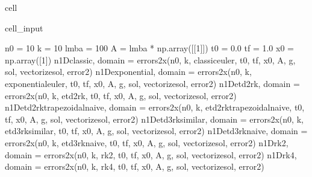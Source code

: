 \documentclass[letterpaper,10pt,english]{jupyterBook}
\begin{document}
\begin{sphinxuseclass}{cell}\begin{sphinxVerbatimInput}

\begin{sphinxuseclass}{cell_input}
\begin{sphinxVerbatim}[commandchars=\\\{\}]
n0 = 10
k = 10
lmba = 100
A = lmba * np.array([[1]])
t0 = 0.0
tf = 1.0
x0 = np.array([1])
n\PYGZus{}1D\PYGZus{}classic, domain = errors\PYGZus{}2x(n0, k, classic\PYGZus{}euler, t0, tf, x0, A, g, sol, vectorize\PYGZus{}sol, error\PYGZus{}2)
n\PYGZus{}1D\PYGZus{}exponential, domain = errors\PYGZus{}2x(n0, k, exponential\PYGZus{}euler, t0, tf, x0, A, g, sol, vectorize\PYGZus{}sol, error\PYGZus{}2)
n\PYGZus{}1D\PYGZus{}etd2rk, domain = errors\PYGZus{}2x(n0, k, etd2rk, t0, tf, x0, A, g, sol, vectorize\PYGZus{}sol, error\PYGZus{}2)
n\PYGZus{}1D\PYGZus{}etd2rk\PYGZus{}trapezoidal\PYGZus{}naive, domain = errors\PYGZus{}2x(n0, k, etd2rk\PYGZus{}trapezoidal\PYGZus{}naive, t0, tf, x0, A, g, sol, vectorize\PYGZus{}sol, error\PYGZus{}2)
n\PYGZus{}1D\PYGZus{}etd3rk\PYGZus{}similar, domain = errors\PYGZus{}2x(n0, k, etd3rk\PYGZus{}similar, t0, tf, x0, A, g, sol, vectorize\PYGZus{}sol, error\PYGZus{}2)
n\PYGZus{}1D\PYGZus{}etd3rk\PYGZus{}naive, domain = errors\PYGZus{}2x(n0, k, etd3rk\PYGZus{}naive, t0, tf, x0, A, g, sol, vectorize\PYGZus{}sol, error\PYGZus{}2)
n\PYGZus{}1D\PYGZus{}rk2, domain = errors\PYGZus{}2x(n0, k, rk2, t0, tf, x0, A, g, sol, vectorize\PYGZus{}sol, error\PYGZus{}2)
n\PYGZus{}1D\PYGZus{}rk4, domain = errors\PYGZus{}2x(n0, k, rk4, t0, tf, x0, A, g, sol, vectorize\PYGZus{}sol, error\PYGZus{}2)
\end{sphinxVerbatim}

\end{sphinxuseclass}\end{sphinxVerbatimInput}

\end{sphinxuseclass}
\end{document}
